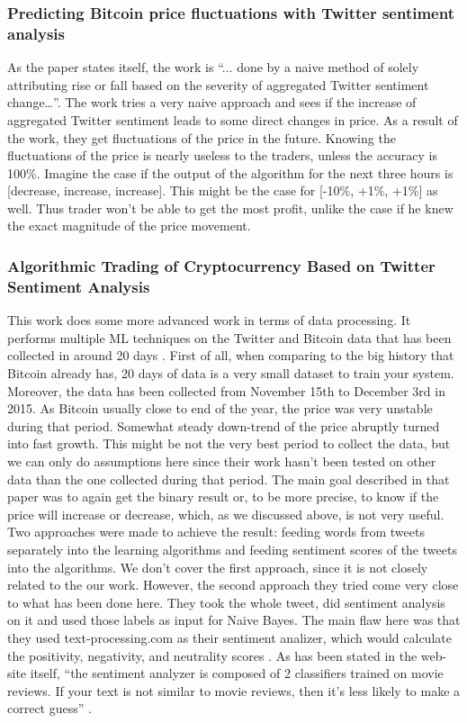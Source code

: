 \documentclass[a4paper,11pt,oneside]{article}
\begin{document}
  \subsubsection{Predicting Bitcoin price fluctuations with Twitter sentiment analysis \cite{related1}}
  
  As the paper states itself, the work is “... done by a naive method of solely attributing rise or fall based on the severity of aggregated Twitter sentiment change…”. The work tries a very naive approach and sees if the increase of aggregated Twitter sentiment leads to some direct changes in price. As a result of the work, they get fluctuations of the price in the future. \cite{related1} Knowing the fluctuations of the price is nearly useless to the traders, unless the accuracy is 100\%. Imagine the case if the output of the algorithm for the next three hours is [decrease, increase, increase]. This might be the case for [-10\%, +1\%, +1\%] as well. Thus trader won’t be able to get the most profit, unlike the case if he knew the exact magnitude of the price movement.
  
  \subsubsection{Algorithmic Trading of Cryptocurrency Based on Twitter Sentiment Analysis \cite{related2}}
  
  This work does some more advanced work in terms of data processing. It performs multiple ML techniques on the Twitter and Bitcoin data that has been collected in around 20 days \cite{related2}. First of all, when comparing to the big history that Bitcoin already has, 20 days of data is a very small dataset to train your system. Moreover, the data has been collected from November 15th to December 3rd in 2015. As Bitcoin usually close to end of the year, the price was very unstable during that period. Somewhat steady down-trend of the price abruptly turned into fast growth. This might be not the very best period to collect the data, but we can only do assumptions here since their work hasn’t been tested on other data than the one collected during that period.
  The main goal described in that paper was to again get the binary result or, to be more precise, to know if the price will increase or decrease, which, as we discussed above, is not very useful. Two approaches were made to achieve the result: feeding words from tweets separately into the learning algorithms and feeding sentiment scores of the tweets into the algorithms. We don’t cover the first approach, since it is not closely related to the our work. However, the second approach they tried come very close to what has been done here. They took the whole tweet, did sentiment analysis on it and used those labels as input for Naive Bayes. The main flaw here was that they used text-processing.com as their sentiment analizer, which would calculate the positivity, negativity, and neutrality scores \cite{related2}. As has been stated in the web-site itself, “the sentiment analyzer is composed of 2 classifiers trained on movie reviews. If your text is not similar to movie reviews, then it’s less likely to make a correct guess” \cite{textprocessingfaq}.
  
\end{document}

